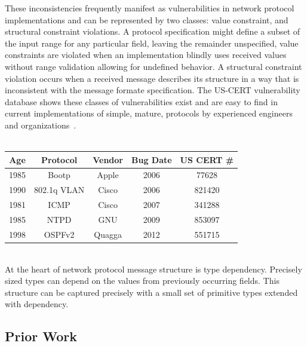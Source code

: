 These inconsistencies frequently manifest as vulnerabilities in network protocol
implementations and can be represented by two classes: value constraint, and 
structural constraint violations. A protocol specification might define a subset
of the input range for any particular field, leaving the remainder unspecified,
value constraints are violated when an implementation blindly uses received
values without range validation allowing for undefined behavior. A structural 
constraint violation occurs when a received message describes its structure in
a way that is inconsistent with the message formate specification.
The US-CERT vulnerability database shows these classes of vulnerabilities exist
and are easy to find in current implementations of simple, mature, protocols by
experienced engineers and organizations~\cite{us_cert}. \\
\\
\begin{tabular}{|c|c|c|c|c|}
   \hline
   Age & Protocol & Vendor & Bug Date & US CERT \# \\ \hline
   \hline
   1985 & Bootp & Apple & 2006 & 77628 \\ \hline
   1990 & 802.1q VLAN & Cisco & 2006 & 821420 \\ \hline
   1981 & ICMP & Cisco & 2007 & 341288 \\ \hline
   1985 & NTPD & GNU & 2009 & 853097 \\ \hline
   1998 & OSPFv2 & Quagga & 2012 & 551715 \\ \hline
\end{tabular} \\

At the heart of network protocol message structure is type dependency. Precisely
sized types can depend on the values from previously occurring fields. This 
structure can be captured precisely with a small set of primitive types extended
with dependency.

\subsection{Prior Work}


